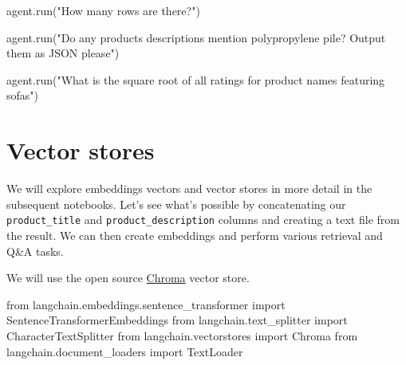 \documentclass[
  letterpaper,
  DIV=11,
  numbers=noendperiod]{scrreprt}
\newenvironment{Shaded}{\begin{snugshade}}{\end{snugshade}}
\newcommand{\ImportTok}[1]{\textcolor[rgb]{0.00,0.46,0.62}{#1}}
\newcommand{\NormalTok}[1]{\textcolor[rgb]{0.00,0.23,0.31}{#1}}
\newcommand{\StringTok}[1]{\textcolor[rgb]{0.13,0.47,0.30}{#1}}
\begin{document}
\begin{Shaded}
\begin{Highlighting}[]
\NormalTok{agent.run(}\StringTok{"How many rows are there?"}\NormalTok{)}
\end{Highlighting}
\end{Shaded}

\begin{Shaded}
\begin{Highlighting}[]
\NormalTok{agent.run(}\StringTok{"Do any products descriptions mention polypropylene pile? Output them as JSON please"}\NormalTok{)}
\end{Highlighting}
\end{Shaded}

\begin{Shaded}
\begin{Highlighting}[]
\NormalTok{agent.run(}\StringTok{"What is the square root of all ratings for product names featuring sofas"}\NormalTok{)}
\end{Highlighting}
\end{Shaded}

\hypertarget{vector-stores}{%
\section{Vector stores}\label{vector-stores}}

We will explore embeddings vectors and vector stores in more detail in
the subsequent notebooks. Let's see what's possible by concatenating our
\texttt{product\_title} and \texttt{product\_description} columns and
creating a text file from the result. We can then create embeddings and
perform various retrieval and Q\&A tasks.

We will use the open source \href{https://docs.trychroma.com/}{Chroma}
vector store.

\begin{Shaded}
\begin{Highlighting}[]
\ImportTok{from}\NormalTok{ langchain.embeddings.sentence\_transformer }\ImportTok{import}\NormalTok{ SentenceTransformerEmbeddings}
\ImportTok{from}\NormalTok{ langchain.text\_splitter }\ImportTok{import}\NormalTok{ CharacterTextSplitter}
\ImportTok{from}\NormalTok{ langchain.vectorstores }\ImportTok{import}\NormalTok{ Chroma}
\ImportTok{from}\NormalTok{ langchain.document\_loaders }\ImportTok{import}\NormalTok{ TextLoader}
\end{Highlighting}
\end{Shaded}
\end{document}

